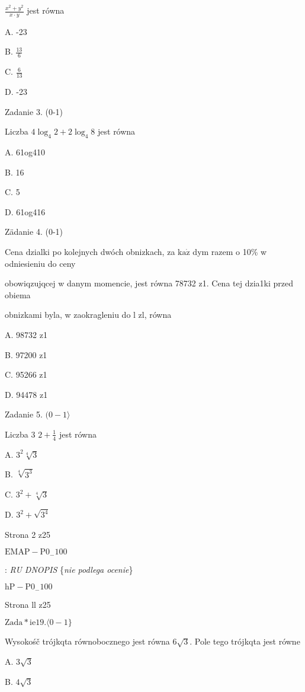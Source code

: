 \documentclass[a4paper,12pt]{article}
\begin{document}
$\displaystyle \frac{x^{2}+y^{2}}{x\cdot y}$ jest równa

A. -23

B. $\displaystyle \frac{13}{6}$

C. $\displaystyle \frac{6}{13}$

D. -23

Zadanie 3. (0-1)

Liczba $4\log_{4}2+2\log_{4}8$ jest równa

A. 61og410

B. 16

C. 5

D. 61og416

Zädanie 4. (0-1)

Cena dzialki po kolejnych dwóch obnizkach, za $\mathrm{k}\mathrm{a}\dot{\mathrm{z}}$ dym razem o 10\% w odniesieniu do ceny

obowiqzujqcej w danym momencie, jest równa 78732 z1. Cena tej dzia1ki przed obiema

obnizkami byla, w zaokragleniu do l zl, równa

A. 98732 z1

B. 97200 z1

C. 95266 z1

D. 94478 z1

Zadanie 5. $(0-1\rangle$

Liczba 3 $2+\displaystyle \frac{1}{4}$ jest równa

A. $3^{2} \sqrt[4]{3}$

B. $\sqrt[4]{3^{3}}$

C. $3^{2}+\sqrt[4]{3}$

D. $3^{2}+ \sqrt{3^{4}}$

Strona 2 z25

$\mathrm{E}\mathrm{M}\mathrm{A}\mathrm{P}-\mathrm{P}0_{-}100$





: {\it RU DNOPIS} \{{\it nie podlega ocenie}\}

$\mathrm{h}\mathrm{P}-\mathrm{P}0_{-}100$

Strona ll z25





$\mathrm{Z}\mathrm{a}\mathrm{d}\mathrm{a}*\mathrm{i}\mathrm{e}19. \langle 0-1\}$

Wysokośč trójkqta równobocznego jest równa $6\sqrt{3}$. Pole tego trójkqta jest równe

A. $3\sqrt{3}$

B. $4\sqrt{3}$
\end{document}
